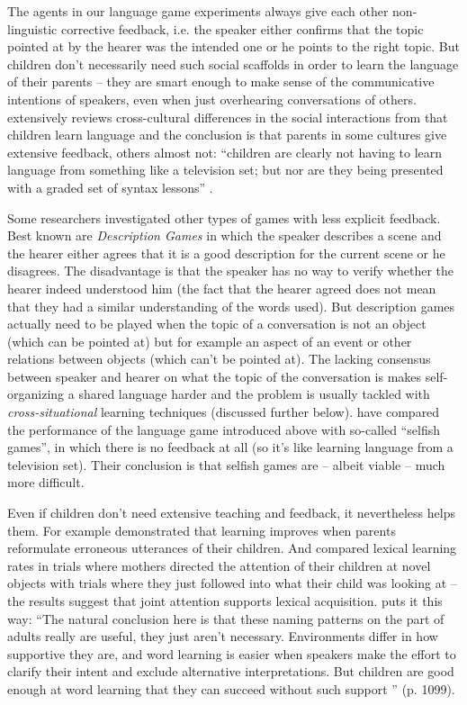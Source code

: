 \noindent The agents in our language game experiments always give each other
non-linguistic corrective feedback, i.e. the speaker either confirms
that the topic pointed at by the hearer was the intended one or he
points to the right topic. But children don't necessarily need such
social scaffolds in order to learn the language of their parents --
they are smart enough to make sense of the communicative intentions of
speakers, even when just overhearing conversations of others.
\cite{lieven94crosslinguistic} extensively reviews cross-cultural
differences in the social interactions from that children learn
language and the conclusion is that parents in some cultures give
extensive feedback, others almost not: ``children are clearly not
having to learn language from something like a television set; but nor
are they being presented with a graded set of syntax lessons''
\citep[p. 73]{lieven94crosslinguistic}.

Some researchers investigated other types of games with less explicit
feedback. Best known are \emph{Description Games} in which the speaker
describes a scene and the hearer either agrees that it is a good
description for the current scene or he disagrees. The disadvantage is
that the speaker has no way to verify whether the hearer indeed
understood him (the fact that the hearer agreed does not mean that
they had a similar understanding of the words used). But description
games actually need to be played when the topic of a conversation is
not an object (which can be pointed at) but for example an aspect of
an event or other relations between objects (which can't be pointed
at). The lacking consensus between speaker and hearer on what the
topic of the conversation is makes self-organizing a shared language
harder and the problem is usually tackled with
\emph{cross-situational} learning techniques (discussed further
below). \cite{vogt03investigating} have compared the performance of the
language game introduced above with so-called ``selfish games'', in
which there is no feedback at all (so it's like learning language from
a television set). Their conclusion is that selfish games are -- albeit
viable -- much more difficult.

Even if children don't need extensive teaching and feedback, it
nevertheless helps them. For example \cite{chouinard03adult}
demonstrated that learning improves when parents reformulate erroneous
utterances of their children. And \citet{tomasello83joint-attention}
compared lexical learning rates in trials where mothers directed the
attention of their children at novel objects with trials where they
just followed into what their child was looking at -- the results
suggest that joint attention supports lexical acquisition.
\cite{bloom01precis} puts it this way: ``The natural conclusion here
is that these naming patterns on the part of adults really are useful,
they just aren't necessary. Environments differ in how supportive they
are, and word learning is easier when speakers make the effort to
clarify their intent and exclude alternative interpretations. But
children are good enough at word learning that they can succeed
without such support '' (p. 1099).

